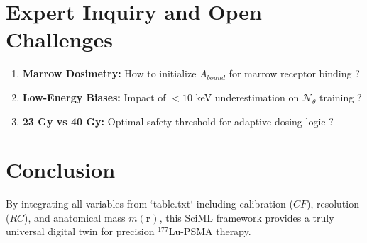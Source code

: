 \documentclass[11pt,a4paper]{article}
\begin{document}
\section{Expert Inquiry and Open Challenges}

\begin{enumerate}
    \item \textbf{Marrow Dosimetry:} How to initialize $A_{bound}$ for marrow receptor binding \cite{VallotBrillouet2024}?
    \item \textbf{Low-Energy Biases:} Impact of $<10$ keV underestimation on $\mathcal{N}_\theta$ training \cite{MikellKappadath2016}?
    \item \textbf{23 Gy vs 40 Gy:} Optimal safety threshold for adaptive dosing logic \cite{GleisnerChouin2022}?
\end{enumerate}

\section{Conclusion}
By integrating all variables from `table.txt` including calibration ($CF$), resolution ($RC$), and anatomical mass $m(\mathbf{r})$, this SciML framework provides a truly universal digital twin for precision $^{177}$Lu-PSMA therapy.



\end{document}
